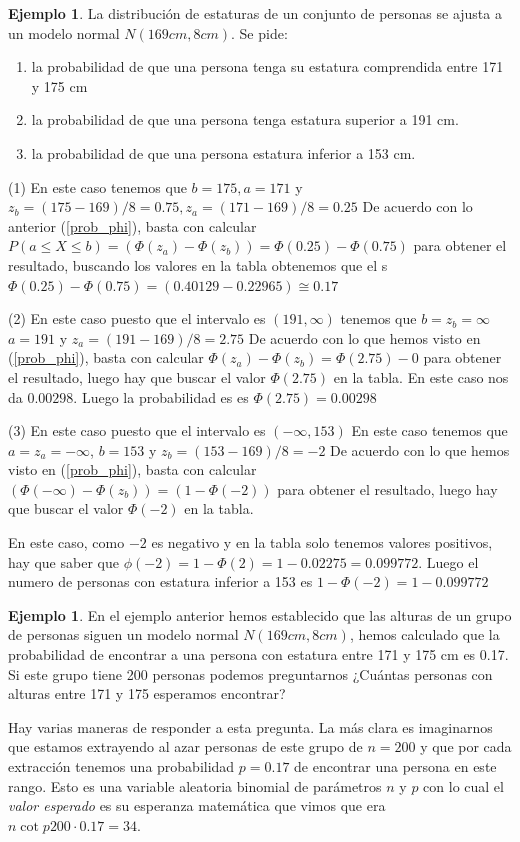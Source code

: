 \documentclass[]{book}
\theoremstyle{plain}
\theoremstyle{definition}
\newtheorem{example}[theorem]{Ejemplo}
\theoremstyle{definition} %
\begin{document}
\begin{example}
  La distribución de estaturas de un conjunto de personas se ajusta a un
modelo normal \(N(169cm,8cm)\). Se pide:

\begin{enumerate}[(1)]
  \item la probabilidad de que una persona tenga su estatura comprendida entre 171 y 175 cm
  \item la probabilidad de que una persona tenga estatura superior a 191 cm.
  \item la probabilidad de que una persona estatura inferior a 153 cm.
\end{enumerate}

(1) En este caso tenemos que \(b = 175, a =171\) y
\(z_b = (175-169)/8=0.75, z_a = (171-169)/8=0.25\) De acuerdo con
lo anterior
(\ref{prob_phi}), basta
con calcular
\(P(a\leq X\leq b) = (\Phi(z_a) - \Phi(z_b))= \Phi(0.25) - \Phi(0.75)\)
para obtener el resultado, buscando los valores en la tabla obtenemos que el s
\(\Phi(0.25) - \Phi(0.75) =   (0.40129 - 0.22965) \cong 0.17\) 


(2) En este caso puesto que el intervalo es $(191,\infty)$ 
tenemos que $b = z_b = \infty$ \(a = 191\) y \(z_a = (191-169)/8=2.75\) De
acuerdo con lo que hemos visto en
(\ref{prob_phi}), basta
con calcular \(\Phi(z_a)- \Phi(z_b)= \Phi(2.75) - 0\) para obtener
el resultado, luego hay que buscar el valor \(\Phi(2.75)\) en la
tabla. En este caso nos da
\(0.00298\). Luego la probabilidad es 
es \(  \Phi(2.75)=  0.00298\)

(3)
En este caso puesto que el intervalo es $(-\infty,153)$
En este caso tenemos que $a=z_a = -\infty$, \(b = 153\) y \(z_b = (153-169)/8=-2\) De
  acuerdo con lo que hemos visto en
  (\ref{prob_phi}), basta
  con calcular \( (\Phi(-\infty) - \Phi(z_b))= (1-\Phi(-2))\) para
  obtener el resultado, luego hay que buscar el valor \(\Phi(-2)\) en la
  tabla.

  En este caso, como \(-2\) es negativo y en la tabla solo tenemos
  valores positivos, hay que saber que
  \(\phi(-2) = 1 - \Phi(2) = 1- 0.02275 = 0.099772\). Luego el numero de
  personas con estatura inferior a 153 es
  \(1-\Phi(-2)= 1-0.099772\)
 
\end{example}


\begin{example}
  En el ejemplo anterior hemos establecido que las alturas de un grupo de personas siguen un modelo normal \(N(169cm,8cm)\), hemos calculado 
  que la probabilidad de encontrar a una persona con  estatura entre 171 y 175 cm es 0.17. Si este grupo tiene 200 personas podemos preguntarnos 
  ¿Cuántas personas con alturas entre 171 y 175 esperamos encontrar?

  Hay varias maneras de responder a esta pregunta. La más clara es imaginarnos que estamos extrayendo al azar personas de este grupo 
  de $n=200$ y que por cada extracción tenemos una probabilidad $p=0.17$ de encontrar una persona en este rango. Esto es una 
  variable aleatoria binomial de parámetros $n$ y $p$ con lo cual el \emph{valor esperado} es su esperanza matemática que vimos que era
  $n\cot p 200 \cdot 0.17 = 34$.
\end{example}
\end{document}
